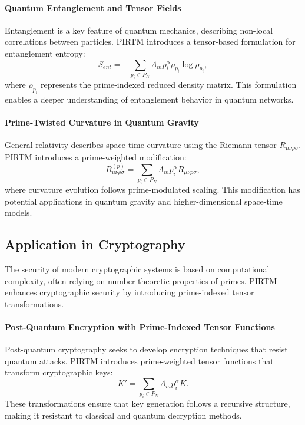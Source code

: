 \documentclass{article}
\theoremstyle{plain}
\begin{document}
\paragraph{Quantum Entanglement and Tensor Fields}
Entanglement is a key feature of quantum mechanics, describing non-local correlations between particles. PIRTM introduces a tensor-based formulation for entanglement entropy:
\begin{equation}
    S_{ent} = - \sum_{p_i \in P_N} \Lambda_m p_i^\alpha \rho_{p_i} \log \rho_{p_i},
\end{equation}
where \( \rho_{p_i} \) represents the prime-indexed reduced density matrix. This formulation enables a deeper understanding of entanglement behavior in quantum networks.

\paragraph{Prime-Twisted Curvature in Quantum Gravity}
General relativity describes space-time curvature using the Riemann tensor \( R_{\mu\nu\rho\sigma} \). PIRTM introduces a prime-weighted modification:
\begin{equation}
    R_{\mu\nu\rho\sigma}^{(p)} = \sum_{p_i \in P_N} \Lambda_m p_i^\alpha R_{\mu\nu\rho\sigma},
\end{equation}
where curvature evolution follows prime-modulated scaling. This modification has potential applications in quantum gravity and higher-dimensional space-time models.

\subsection{Application in Cryptography}

The security of modern cryptographic systems is based on computational complexity, often relying on number-theoretic properties of primes. PIRTM enhances cryptographic security by introducing prime-indexed tensor transformations.

\paragraph{Post-Quantum Encryption with Prime-Indexed Tensor Functions}
Post-quantum cryptography seeks to develop encryption techniques that resist quantum attacks. PIRTM introduces prime-weighted tensor functions that transform cryptographic keys:
\begin{equation}
    K' = \sum_{p_i \in P_N} \Lambda_m p_i^\alpha K.
\end{equation}
These transformations ensure that key generation follows a recursive structure, making it resistant to classical and quantum decryption methods.
\end{document}
